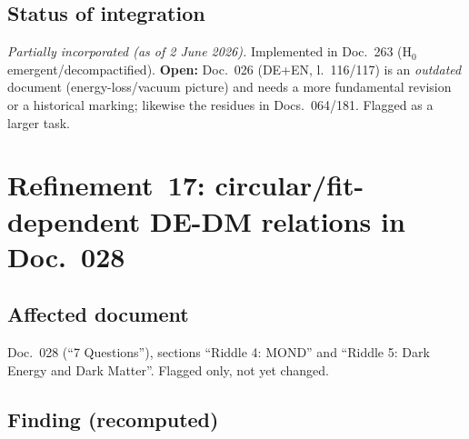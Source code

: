 \subsection*{Status of integration}

\emph{Partially incorporated (as of 2 June 2026).} Implemented in Doc.~263
(H$_0$ emergent/decompactified). \textbf{Open:} Doc.~026 (DE+EN, l.~116/117) is
an \emph{outdated} document (energy-loss/vacuum picture) and needs a more
fundamental revision or a historical marking; likewise the residues in
Docs.~064/181. Flagged as a larger task.

\section{\texorpdfstring{Refinement~17: circular/fit-dependent DE-DM relations in Doc.~028}{Refinement 17: circular DE-DM relations in Doc 028}}

\subsection*{Affected document}

Doc.~028 (\enquote{7 Questions}), sections \enquote{Riddle 4: MOND} and
\enquote{Riddle 5: Dark Energy and Dark Matter}. Flagged only, not yet changed.

\subsection*{Finding (recomputed)}

